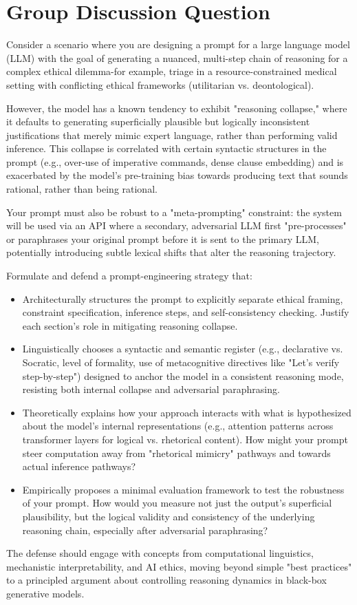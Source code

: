 \documentclass[10pt]{article}
\begin{document}
\section*{Group Discussion Question}
Consider a scenario where you are designing a prompt for a large language model (LLM) with the goal of generating a nuanced, multi-step chain of reasoning for a complex ethical dilemma-for example, triage in a resource-constrained medical setting with conflicting ethical frameworks (utilitarian vs. deontological).

However, the model has a known tendency to exhibit "reasoning collapse," where it defaults to generating superficially plausible but logically inconsistent justifications that merely mimic expert language, rather than performing valid inference. This collapse is correlated with certain syntactic structures in the prompt (e.g., over-use of imperative commands, dense clause embedding) and is exacerbated by the model's pre-training bias towards producing text that sounds rational, rather than being rational.

Your prompt must also be robust to a "meta-prompting" constraint: the system will be used via an API where a secondary, adversarial LLM first "pre-processes" or paraphrases your original prompt before it is sent to the primary LLM, potentially introducing subtle lexical shifts that alter the reasoning trajectory.

Formulate and defend a prompt-engineering strategy that:

\begin{itemize}
  \item Architecturally structures the prompt to explicitly separate ethical framing, constraint specification, inference steps, and self-consistency checking. Justify each section's role in mitigating reasoning collapse.
  \item Linguistically chooses a syntactic and semantic register (e.g., declarative vs. Socratic, level of formality, use of metacognitive directives like "Let's verify step-by-step") designed to anchor the model in a consistent reasoning mode, resisting both internal collapse and adversarial paraphrasing.
  \item Theoretically explains how your approach interacts with what is hypothesized about the model's internal representations (e.g., attention patterns across transformer layers for logical vs. rhetorical content). How might your prompt steer computation away from "rhetorical mimicry" pathways and towards actual inference pathways?
  \item Empirically proposes a minimal evaluation framework to test the robustness of your prompt. How would you measure not just the output's superficial plausibility, but the logical validity and consistency of the underlying reasoning chain, especially after adversarial paraphrasing?
\end{itemize}

The defense should engage with concepts from computational linguistics, mechanistic interpretability, and AI ethics, moving beyond simple "best practices" to a principled argument about controlling reasoning dynamics in black-box generative models.
\end{document}
